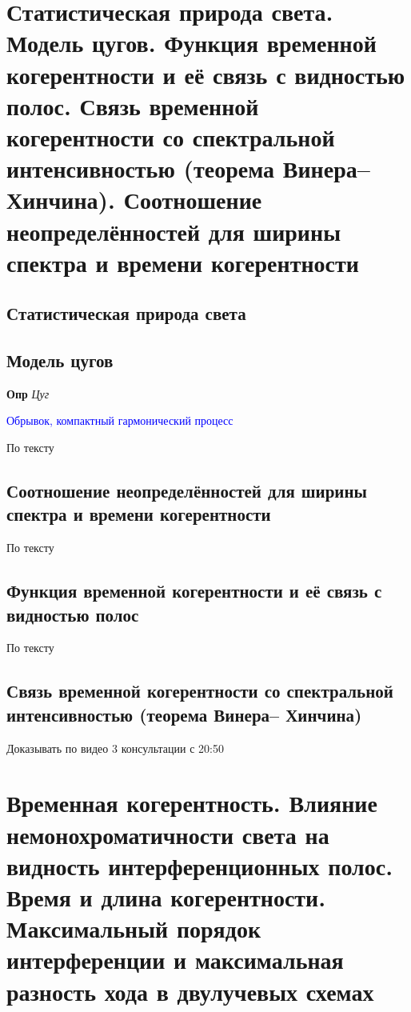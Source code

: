 \documentclass[a4paper, 14pt]{article}
\begin{document}
    \section{Статистическая природа света.
    Модель цугов.
    Функция временной когерентности и её связь с видностью полос.
    Связь временной когерентности со спектральной интенсивностью (теорема Винера– Хинчина).
    Соотношение неопределённостей для ширины спектра и времени когерентности}
    
    \subsection{Статистическая природа света}
    
    \subsection{Модель цугов}
    
    \textbf{Опр} \textit{Цуг}
    
    \textcolor{blue}{Обрывок, компактный гармонический процесс}
    
    По тексту
    
    \subsection{Соотношение неопределённостей для ширины спектра и времени когерентности}
    
    По тексту
    
    \subsection{Функция временной когерентности и её связь с видностью полос}
    
    По тексту
    
    \subsection{Связь временной когерентности со спектральной интенсивностью (теорема Винера– Хинчина)}
    
    Доказывать по видео 3 консультации с 20:50
    
    \section{Временная когерентность.
    Влияние немонохроматичности света на видность интерференционных полос.
    Время и длина когерентности.
    Максимальный порядок интерференции и максимальная разность хода в двулучевых схемах}
    
\end{document}

